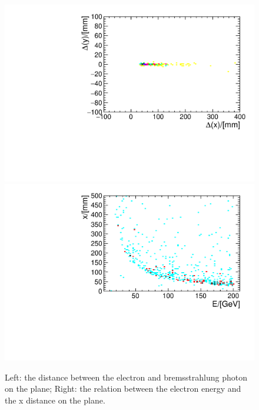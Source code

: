 \begin{figure}[!htbp]
  \begin{center}
    \includegraphics[width=0.49\linewidth]{Figures/06_ECAL/Brem/x_y_dis.pdf}
    \includegraphics[width=0.49\linewidth]{Figures/06_ECAL/Brem/x_E_dis.pdf}
    \vspace*{-0.5cm}
  \end{center}
  \caption{
  Left: the distance between the electron and bremsstrahlung photon on the \ecal plane; 
  Right: the relation between the electron energy and the x distance on the \ecal plane.
  }
  \label{fig:Brem_electron_distance}
\end{figure}

